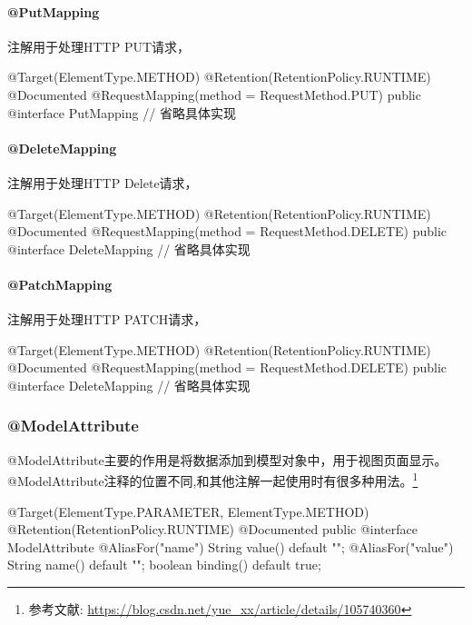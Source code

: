 \paragraph*{@PutMapping}

注解用于处理HTTP PUT请求，

\begin{Java}
@Target(ElementType.METHOD)
@Retention(RetentionPolicy.RUNTIME)
@Documented
@RequestMapping(method = RequestMethod.PUT)
public @interface PutMapping {
    // 省略具体实现
}
\end{Java}

\paragraph*{@DeleteMapping}

注解用于处理HTTP Delete请求，

\begin{Java}
@Target(ElementType.METHOD)
@Retention(RetentionPolicy.RUNTIME)
@Documented
@RequestMapping(method = RequestMethod.DELETE)
public @interface DeleteMapping {
    // 省略具体实现
}
\end{Java}

\paragraph*{@PatchMapping}

注解用于处理HTTP PATCH请求，

\begin{Java}
@Target(ElementType.METHOD)
@Retention(RetentionPolicy.RUNTIME)
@Documented
@RequestMapping(method = RequestMethod.DELETE)
public @interface DeleteMapping {
    // 省略具体实现
}
\end{Java}

\subsubsection{@ModelAttribute}

@ModelAttribute主要的作用是将数据添加到模型对象中，用于视图页面显示。@ModelAttribute注释的位置不同,和其他注解一起使用时有很多种用法。\footnote{参考文献: \url{https://blog.csdn.net/yue_xx/article/details/105740360}}

\begin{Java}
@Target({ElementType.PARAMETER, ElementType.METHOD})
@Retention(RetentionPolicy.RUNTIME)
@Documented
public @interface ModelAttribute {
    @AliasFor("name")
    String value() default "";
    @AliasFor("value")
    String name() default "";
    boolean binding() default true;
}
\end{Java}

